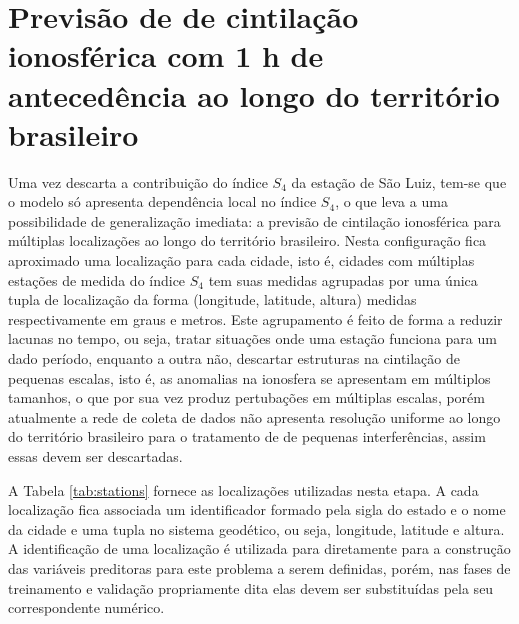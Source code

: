 
\section{Previsão de de cintilação ionosférica com 1 h de antecedência ao longo do território brasileiro}

Uma vez descarta a contribuição do índice $S_4$ da estação de São Luiz, tem-se que o modelo só apresenta dependência local no índice $S_4$, o que leva a uma possibilidade de generalização imediata: a previsão de cintilação ionosférica para múltiplas localizações ao longo do território brasileiro. Nesta configuração fica aproximado uma localização para cada cidade, isto é, cidades com múltiplas estações de medida do índice $S_4$ tem suas medidas agrupadas por uma única tupla de localização da forma (longitude, latitude, altura) medidas respectivamente em graus e metros. Este agrupamento é feito de forma a reduzir lacunas no tempo, ou seja, tratar situações onde uma estação funciona para um dado período, enquanto a outra não, descartar estruturas na cintilação de pequenas escalas, isto é, as anomalias na ionosfera se apresentam em múltiplos tamanhos, o que por sua vez produz pertubações em múltiplas escalas, porém atualmente a rede de coleta de dados não apresenta resolução uniforme ao longo do território brasileiro para o tratamento de de pequenas interferências, assim essas devem ser descartadas.

A Tabela \ref{tab:stations} fornece as localizações utilizadas nesta etapa. A cada localização fica associada um identificador formado pela sigla do estado e o nome da cidade e uma tupla no sistema geodético, ou seja, longitude, latitude e altura. A identificação de uma localização é utilizada para diretamente para a construção das variáveis preditoras para este problema a serem definidas, porém, nas fases de treinamento e validação propriamente dita elas devem ser substituídas pela seu correspondente numérico.

